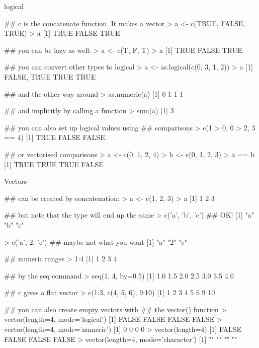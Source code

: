 \documentclass[pdf]{beamer}
\begin{document}
\begin{frame}[fragile]{logical}
  \begin{rcode}
    ## c is the concatenate function. It makes a vector
    > a <- c(TRUE, FALSE, TRUE)
    > a
    [1] TRUE FALSE TRUE

    ## you can be lazy as well:
    > a <- c(T, F, T)
    > a
    [1] TRUE FALSE TRUE
    
    ## you can convert other types to logical
    > a <- as.logical(c(0, 3, 1, 2))
    > a
    [1] FALSE, TRUE TRUE TRUE
    
    ## and the other way around
    > as.numeric(a)
    [1] 0 1 1 1
    
    ## and implicitly by calling a function
    > sum(a)
    [1] 3
    
    ## you can also set up logical values using
    ## comparisons
    > c(1 > 0, 0 > 2, 3 == 4)
    [1] TRUE FALSE FALSE

    ## or vectorised comparisons
    > a <- c(0, 1, 2, 4)
    > b <- c(0, 1, 2, 3)
    > a == b
    [1] TRUE TRUE TRUE FALSE
  \end{rcode}
\end{frame}

\begin{frame}[fragile]{Vectors}
  \begin{rcode}
    ## can be created by concatenation:
    > a <- c(1, 2, 3)
    > a
    [1] 1 2 3
    
    ## but note that the type will end up the same
    > c('a', 'b', 'c')  ## OK!
    [1] "a" "b" "c"
    
    > c('a', 2, 'c') ## maybe not what you want
    [1] "a" "2" "c"
   
    ## numeric ranges
    > 1:4
    [1] 1 2 3 4

    ## by the seq command
    > seq(1, 4, by=0.5)
    [1] 1.0 1.5 2.0 2.5 3.0 3.5 4.0

    ## c gives a flat vector
    > c(1:3, c(4, 5, 6), 9:10)
    [1]  1  2  3  4  5  6  9 10

    ## you can also create empty vectors with
    ## the vector() function
    > vector(length=4, mode='logical')
    [1] FALSE FALSE FALSE FALSE
    > vector(length=4, mode='numeric')
    [1] 0 0 0 0
    > vector(length=4)
    [1] FALSE FALSE FALSE FALSE
    > vector(length=4, mode='character')
    [1] "" "" "" ""
  \end{rcode}
\end{frame}
\end{document}
